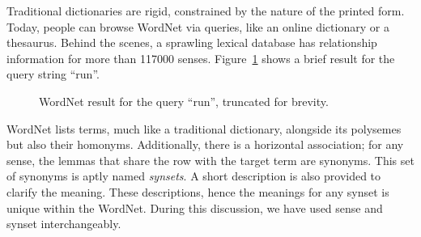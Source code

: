 Traditional dictionaries are rigid, constrained by the nature of the printed form.
Today, people can browse WordNet via queries, like an online dictionary or a thesaurus.
Behind the scenes, a sprawling lexical database has relationship information for more than 117000 senses.
Figure~\ref{fig:example_run} shows a brief result for the query string \enquote{run}.

\begin{figure}[!hbp]
    \begin{center}
        {%
            \setlength{\fboxsep}{1pt}%
            \setlength{\fboxrule}{1pt}%
        }%
        \caption{WordNet result for the query \enquote{run}, truncated for brevity.}\label{fig:example_run}
    \end{center}
\end{figure}

WordNet lists terms, much like a traditional dictionary, alongside its polysemes but also their homonyms.
Additionally, there is a horizontal association; for any sense, the lemmas that share the row with the target term are synonyms.
This set of synonyms is aptly named \emph{synsets}.
A short description is also provided to clarify the meaning.
These descriptions, hence the meanings for any synset is unique within the WordNet.
During this discussion, we have used sense and synset interchangeably.

